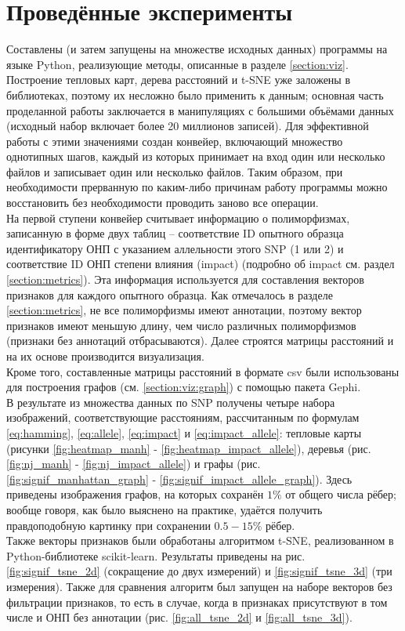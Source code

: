 \documentclass[main.tex]{subfiles}
\begin{document}
\section{Проведённые эксперименты}\label{experiments}

Составлены (и затем запущены на множестве исходных данных) программы на языке Python, реализующие методы, описанные в разделе \ref{section:viz}. Построение тепловых карт, дерева расстояний и t-SNE уже заложены в библиотеках, поэтому их несложно было применить к данным; основная часть проделанной работы заключается в манипуляциях с большими объёмами данных (исходный набор включает более 20 миллионов записей). Для эффективной работы с этими значениями создан конвейер, включающий множество однотипных шагов, каждый из которых принимает на вход один или несколько файлов и записывает один или несколько файлов. Таким образом, при необходимости прерванную по каким-либо причинам работу программы можно восстановить без необходимости проводить заново все операции. \\
На первой ступени конвейер считывает информацию о полиморфизмах, записанную в форме двух таблиц -- соответствие ID опытного образца идентификатору ОНП с указанием аллельности этого SNP (1 или 2) и соответствие ID ОНП степени влияния (impact) (подробно об impact см. раздел \ref{section:metrics}). Эта информация используется для составления векторов признаков для каждого опытного образца. Как отмечалось в разделе \ref{section:metrics}, не все полиморфизмы имеют аннотации, поэтому вектор признаков имеют меньшую длину, чем число различных полиморфизмов (признаки без аннотаций отбрасываются). Далее строятся матрицы расстояний и на их основе производится визуализация. \\
Кроме того, составленные матрицы расстояний в формате csv были использованы для построения графов (см. \ref{section:viz:graph}) с помощью пакета Gephi. \\

В результате из множества данных по SNP получены четыре набора изображений, соответствующие расстояниям, рассчитанным по формулам \eqref{eq:hamming}, \eqref{eq:allele}, \eqref{eq:impact} и \eqref{eq:impact_allele}: тепловые карты (рисунки \ref{fig:heatmap_manh} - \ref{fig:heatmap_impact_allele}), деревья (рис. \ref{fig:nj_manh} - \ref{fig:nj_impact_allele}) и графы (рис. \ref{fig:signif_manhattan_graph} - \ref{fig:signif_impact_allele_graph}).
Здесь приведены изображения графов, на которых сохранён $1\%$ от общего числа рёбер; вообще говоря, как было выяснено на практике, удаётся получить правдоподобную картинку при сохранении $0.5-15\%$ рёбер. \\
Также векторы признаков были обработаны алгоритмом t-SNE, реализованном в Python-библиотеке scikit-learn. Результаты приведены на рис. \ref{fig:signif_tsne_2d} (сокращение до двух измерений) и \ref{fig:signif_tsne_3d} (три измерения). Также для сравнения алгоритм был запущен на наборе векторов без фильтрации признаков, то есть в случае, когда в признаках присутствуют в том числе и ОНП без аннотации (рис. \ref{fig:all_tsne_2d} и \ref{fig:all_tsne_3d}). \\
\end{document}
